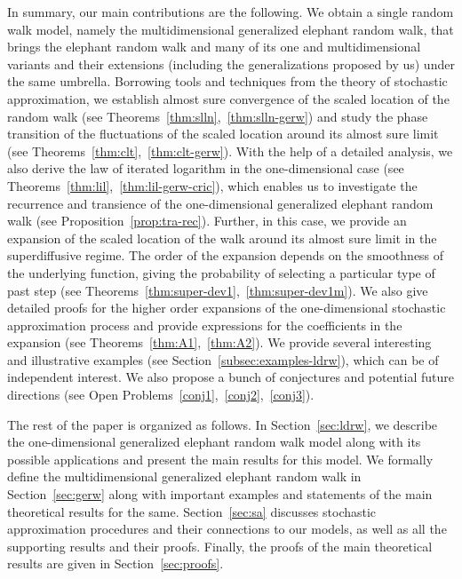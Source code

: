 \documentclass[12pt]{amsart}
\theoremstyle{plain}
\theoremstyle{remark}
\numberwithin{equation}{section}
\begin{document}
In summary, our main contributions are the following. We obtain a single random walk model, namely the multidimensional generalized elephant random walk, that brings the elephant random walk and many of its one and multidimensional variants and their extensions (including the generalizations proposed by us) under the same umbrella. {Borrowing tools and techniques from the theory of stochastic approximation, we establish almost sure convergence of the scaled location of the random walk (see Theorems~\ref{thm:slln},~\ref{thm:slln-gerw}) and study the phase transition %
of the fluctuations of the scaled location around its almost sure limit (see Theorems~\ref{thm:clt},~\ref{thm:clt-gerw}).} With the help of a detailed analysis, we also derive the law of iterated logarithm in the one-dimensional case (see Theorems~\ref{thm:lil},~\ref{thm:lil-gerw-cric}), which enables us to investigate the recurrence and transience of the one-dimensional generalized elephant random walk (see Proposition~\ref{prop:tra-rec}). Further, in this case, we provide an expansion of the scaled location of the walk around its almost sure limit in the superdiffusive regime. The order of the expansion depends on the smoothness of the underlying function, giving the probability of selecting a particular type of past step (see Theorems~\ref{thm:super-dev1},~\ref{thm:super-dev1m}). {We also give detailed proofs for the higher order expansions of the one-dimensional stochastic approximation process and provide expressions for the coefficients in the expansion (see Theorems~\ref{thm:A1},~\ref{thm:A2}).} We provide several interesting and illustrative examples (see Section~\ref{subsec:examples-ldrw}), which can be of independent interest. We also propose a bunch of conjectures and potential future directions (see Open Problems~\ref{conj1},~\ref{conj2},~\ref{conj3}).

The rest of the paper is organized as follows. In Section~\ref{sec:ldrw}, we describe the one-dimensional generalized elephant random walk model along with its possible applications and present the main results for this model. We formally define the multidimensional generalized elephant random walk in Section~\ref{sec:gerw} along with important examples and statements of the main theoretical results for the same. Section~\ref {sec:sa} discusses stochastic approximation procedures and their connections to our models, as well as all the supporting results and their proofs. Finally, the proofs of the main theoretical results are given in Section~\ref{sec:proofs}. 
\end{document}
